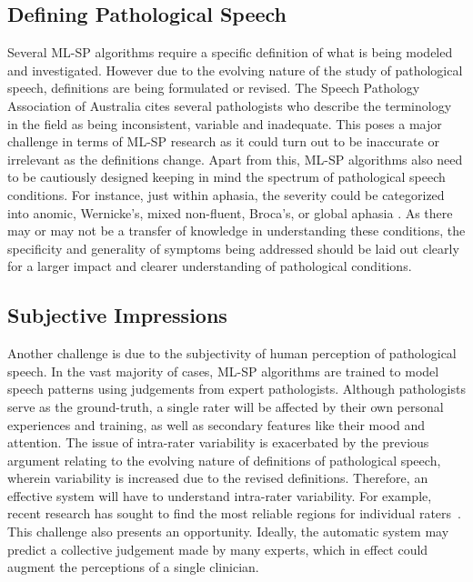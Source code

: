 \documentclass{article}
\begin{document}
\subsection{Defining Pathological Speech}
Several ML-SP algorithms require a specific definition of what is being modeled and investigated.
However due to the evolving nature of the study of pathological speech, definitions are being formulated or revised. 
The Speech Pathology Association of Australia \cite{australia2009criteria} cites several pathologists who describe the terminology in the field as being inconsistent, variable and inadequate. 
This poses a major challenge in terms of ML-SP research as it could turn out to be inaccurate or irrelevant as the definitions change.
Apart from this, ML-SP algorithms also need to be cautiously designed keeping in mind the spectrum of pathological speech conditions.
For instance, just within aphasia, the severity could be categorized into anomic, Wernicke's, mixed non-fluent, Broca's, or global aphasia \cite{mesulam1992primary}. 
As there may or may not be a transfer of knowledge in understanding these conditions, the specificity and generality of symptoms being addressed should be laid out clearly for a larger impact and clearer understanding of pathological conditions. 


\subsection{Subjective Impressions}
Another challenge is due to the subjectivity of human perception of pathological speech. In the vast majority of cases, ML-SP algorithms are trained to model speech patterns using judgements from expert pathologists.
Although pathologists serve as the ground-truth, a single rater will be affected by their own personal experiences and training, as well as secondary features like their mood and attention. The issue of intra-rater variability is exacerbated by the previous argument relating to the evolving nature of definitions of pathological speech, wherein variability is increased due to the revised definitions. Therefore, an effective system will have to understand intra-rater variability. For example, recent research has sought to find the most reliable regions for individual raters~\cite{audhkhasi2013globally}. This challenge also presents an opportunity. Ideally, the automatic system may predict a collective judgement made by many experts, which in effect could augment the perceptions of a single clinician.
\end{document}
